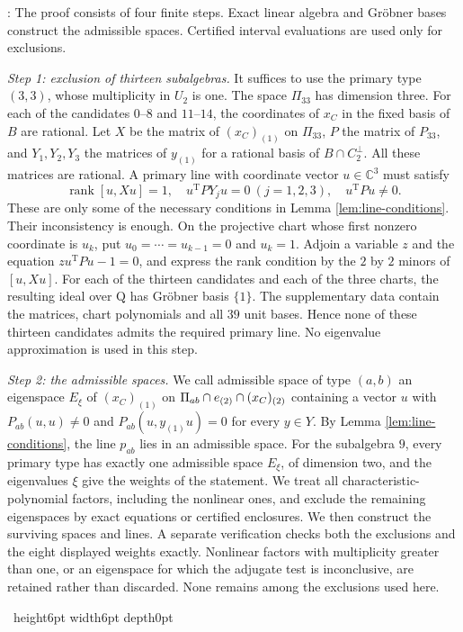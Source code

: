 \documentclass[leqno]{article}
\newcommand{\Cbb}{\ensuremath{\mathbb{C}}}
\newcommand{\Q}{\mathrm{Q}}
\newcommand{\qed}{\hfill \vrule height6pt  width6pt depth0pt}
\let\ker\relax
\DeclareMathOperator{\ker}{Ker}
\newenvironment{proof}[1][]{\noindent {\it Proof #1} : }{\hbox{~}\qed
\smallskip
}
\numberwithin{equation}{section}
\begin{document}
\begin{proof}
The proof consists of four finite steps. Exact linear algebra and Gröbner bases construct the admissible spaces. Certified interval evaluations are used only for exclusions.

\emph{Step 1: exclusion of thirteen subalgebras.} It suffices to use the primary type $(3,3)$, whose multiplicity in $U_2$ is one. The space $\Pi_{33}$ has dimension three. For each of the candidates $0$--$8$ and $11$--$14$, the coordinates of $x_C$ in the fixed basis of $B$ are rational. Let $X$ be the matrix of $(x_C)_{(1)}$ on $\Pi_{33}$, $P$ the matrix of $P_{33}$, and $Y_1,Y_2,Y_3$ the matrices of $y_{(1)}$ for a rational basis of $B \cap C_2^\perp$. All these matrices are rational. A primary line with coordinate vector $u \in \Cbb^3$ must satisfy
\[
\operatorname{rank}[u,Xu] = 1, \quad u^{\mathrm T} P Y_j u = 0 \ (j = 1,2,3), \quad u^{\mathrm T}Pu \neq 0.
\]
These are only some of the necessary conditions in Lemma \ref{lem:line-conditions}. Their inconsistency is enough. On the projective chart whose first nonzero coordinate is $u_k$, put $u_0 = \cdots = u_{k-1} = 0$ and $u_k = 1$. Adjoin a variable $z$ and the equation $z u^{\mathrm T}Pu-1 = 0$, and express the rank condition by the $2$ by $2$ minors of $[u,Xu]$. For each of the thirteen candidates and each of the three charts, the resulting ideal over $\Q$ has Gröbner basis $\{1\}$. The supplementary data contain the matrices, chart polynomials and all $39$ unit bases. Hence none of these thirteen candidates admits the required primary line. No eigenvalue approximation is used in this step.

\emph{Step 2: the admissible spaces.} We call admissible space of type $(a,b)$ an eigenspace $E_\xi$ of $(x_C)_{(1)}$ on $\Pi_{ab} \cap \ker e_{(2)} \cap \ker (x_C)_{(2)}$ containing a vector $u$ with $P_{ab}(u,u) \neq 0$ and $P_{ab}(u,y_{(1)}u) = 0$ for every $y \in Y$. By Lemma \ref{lem:line-conditions}, the line $p_{ab}$ lies in an admissible space. For the subalgebra $9$, every primary type has exactly one admissible space $E_\xi$, of dimension two, and the eigenvalues $\xi$ give the weights of the statement. We treat all characteristic-polynomial factors, including the nonlinear ones, and exclude the remaining eigenspaces by exact equations or certified enclosures. We then construct the surviving spaces and lines. A separate verification checks both the exclusions and the eight displayed weights exactly. Nonlinear factors with multiplicity greater than one, or an eigenspace for which the adjugate test is inconclusive, are retained rather than discarded. None remains among the exclusions used here.


\end{proof}
\end{document}
